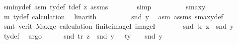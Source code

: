 \begin{isabellebody}
\ s{}{\isacharunderscore}{\kern0pt}miny{\isacharunderscore}{\kern0pt}def\ asm\ ty{\isacharunderscore}{\kern0pt}def\ t{\isacharunderscore}{\kern0pt}def\ z{}{\isacharparenleft}{\kern0pt}{}{\isacharparenright}{\kern0pt}\ assms{\isacharparenleft}{\kern0pt}{}{\isacharparenright}{\kern0pt}\isanewline
\ \ \ \ \ \ \isamarkupfalse%
\ simp\isanewline
\ \ \ \ \isamarkupfalse%
\ \isamarkupfalse%
\ {\isachardoublequoteopen}{\isachardot}{\kern0pt}{\isachardot}{\kern0pt}{\isachardot}{\kern0pt}\ {\isasymge}\ s{}{\isacharunderscore}{\kern0pt}maxy{\isachardoublequoteclose}\ \isamarkupfalse%
\ m{}{\isacharparenleft}{\kern0pt}{}{\isacharparenright}{\kern0pt}\ ty{}{\isacharunderscore}{\kern0pt}def\ calculation\ \isamarkupfalse%
\ linarith\isanewline
\ \ \ \ \isamarkupfalse%
\ \isamarkupfalse%
\ {\isachardoublequoteopen}{\isachardot}{\kern0pt}{\isachardot}{\kern0pt}{\isachardot}{\kern0pt}\ {\isasymge}\ snd\ y{\isachardoublequoteclose}\ \isamarkupfalse%
\ asm{\isacharparenleft}{\kern0pt}{}{\isacharparenright}{\kern0pt}\ assms{\isacharparenleft}{\kern0pt}{}{\isacharparenright}{\kern0pt}\ s{}{\isacharunderscore}{\kern0pt}maxy{\isacharunderscore}{\kern0pt}def\isanewline
\ \ \ \ \ \ \isamarkupfalse%
\ {\isacharparenleft}{\kern0pt}smt\ {\isacharparenleft}{\kern0pt}verit{\isacharparenright}{\kern0pt}\ Max{\isacharunderscore}{\kern0pt}ge\ calculation{\isacharparenleft}{\kern0pt}{}{\isacharparenright}{\kern0pt}\ finite{\isacharunderscore}{\kern0pt}imageI\ imageI{\isacharparenright}{\kern0pt}\isanewline
\ \ \ \ \isamarkupfalse%
\ \isamarkupfalse%
\ {}{\isacharcolon}{\kern0pt}{\isachardoublequoteopen}snd\ {\isacharparenleft}{\kern0pt}{\isacharquery}{\kern0pt}tr\ z{}{\isacharparenright}{\kern0pt}\ {\isacharminus}{\kern0pt}\ snd\ y\ {\isasymge}\ {}{\isachardoublequoteclose}\ \isamarkupfalse%
\ ty{}{\isacharunderscore}{\kern0pt}def\ \isamarkupfalse%
\ argo\isanewline
\isanewline
\ \ \ \ \isamarkupfalse%
\ {}{\isacharcolon}{\kern0pt}{\isachardoublequoteopen}snd\ {\isacharparenleft}{\kern0pt}{\isacharquery}{\kern0pt}tr\ z{}{\isacharparenright}{\kern0pt}\ {\isacharminus}{\kern0pt}\ snd\ y\ \ {\isasymge}\ ty{}\ {\isacharplus}{\kern0pt}\ {}\ {\isacharminus}{\kern0pt}\ snd\ y{\isachardoublequoteclose}\ \isanewline

\end{isabellebody}
